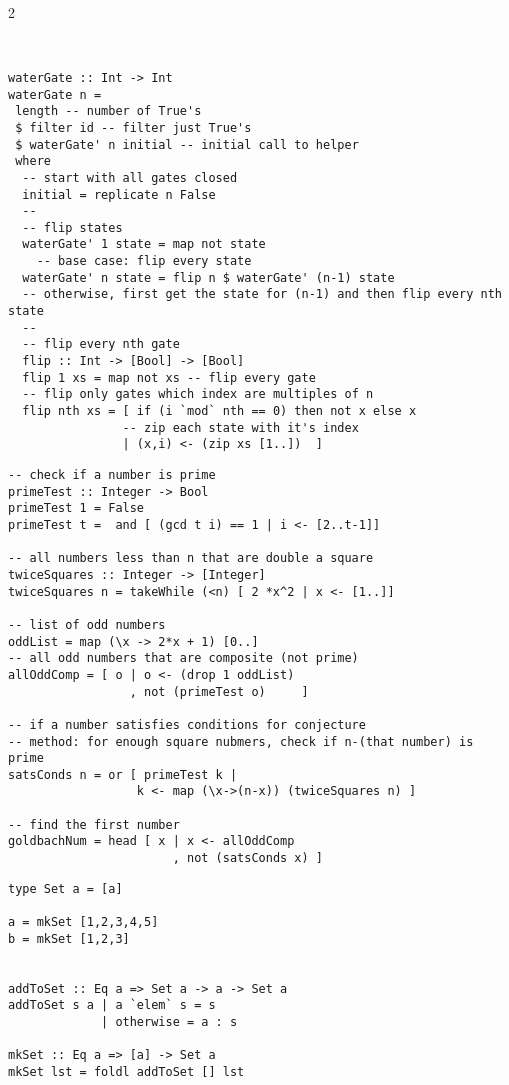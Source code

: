 \documentclass{article}
\def \columncount {2}
\begin{document}
\begin{multicols*}{\columncount}
\begin{outline}[longenum]
\begin{verbatim}


waterGate :: Int -> Int
waterGate n =
 length -- number of True's
 $ filter id -- filter just True's
 $ waterGate' n initial -- initial call to helper
 where
  -- start with all gates closed
  initial = replicate n False
  --
  -- flip states
  waterGate' 1 state = map not state 
    -- base case: flip every state
  waterGate' n state = flip n $ waterGate' (n-1) state
  -- otherwise, first get the state for (n-1) and then flip every nth state
  --
  -- flip every nth gate
  flip :: Int -> [Bool] -> [Bool]
  flip 1 xs = map not xs -- flip every gate
  -- flip only gates which index are multiples of n
  flip nth xs = [ if (i `mod` nth == 0) then not x else x
                -- zip each state with it's index
                | (x,i) <- (zip xs [1..])  ]

\end{verbatim}

\begin{verbatim}
-- check if a number is prime
primeTest :: Integer -> Bool
primeTest 1 = False
primeTest t =  and [ (gcd t i) == 1 | i <- [2..t-1]]

-- all numbers less than n that are double a square
twiceSquares :: Integer -> [Integer]
twiceSquares n = takeWhile (<n) [ 2 *x^2 | x <- [1..]]

-- list of odd numbers
oddList = map (\x -> 2*x + 1) [0..]
-- all odd numbers that are composite (not prime)
allOddComp = [ o | o <- (drop 1 oddList)
                 , not (primeTest o)     ]

-- if a number satisfies conditions for conjecture
-- method: for enough square nubmers, check if n-(that number) is prime
satsConds n = or [ primeTest k | 
                  k <- map (\x->(n-x)) (twiceSquares n) ]

-- find the first number 
goldbachNum = head [ x | x <- allOddComp
                       , not (satsConds x) ]
\end{verbatim}


\begin{verbatim}
type Set a = [a]

a = mkSet [1,2,3,4,5]
b = mkSet [1,2,3]


addToSet :: Eq a => Set a -> a -> Set a
addToSet s a | a `elem` s = s
             | otherwise = a : s

mkSet :: Eq a => [a] -> Set a
mkSet lst = foldl addToSet [] lst


\end{verbatim}
\end{outline}
\end{multicols*}
\end{document}
